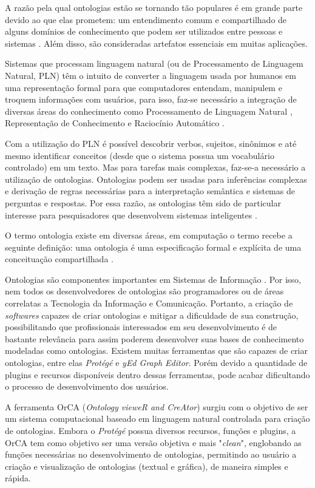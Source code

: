 \documentclass{bcc}
\begin{document}
A razão pela qual ontologias estão se tornando tão populares é em grande parte devido ao que elas prometem: um entendimento comum e compartilhado de alguns domínios de conhecimento que podem ser utilizados entre pessoas e sistemas \cite{fensel2001}. Além disso, são consideradas artefatos essenciais em muitas aplicações.

Sistemas que processam linguagem natural (ou de Processamento de Linguagem Natural, PLN) têm o intuito de converter a linguagem usada por humanos em uma representação formal para que computadores entendam, manipulem e troquem informações com usuários, para isso, faz-se necessário a integração de diversas áreas do conhecimento como Processamento de Linguagem Natural \cite{brill1995}, Representação de Conhecimento \cite{levesque1986} e Raciocínio Automático \cite{wos1984}.

Com a utilização do PLN é possível descobrir verbos, sujeitos, sinônimos e até mesmo identificar conceitos (desde que o sistema possua um vocabulário controlado) em um texto. Mas para tarefas mais complexas, faz-se-a necessário a utilização de ontologias. Ontologias podem ser usadas para inferências complexas e derivação de regras necessárias para a interpretação semântica e sistemas de perguntas e respostas. Por essa razão, as ontologias têm sido de particular interesse para pesquisadores que desenvolvem sistemas inteligentes \cite{liu2011}.

O termo ontologia existe em diversas áreas, em computação o termo recebe a seguinte definição: uma ontologia é uma especificação formal e explícita de uma conceituação compartilhada \cite{gruber1995}.

Ontologias são componentes importantes em Sistemas de Informação \cite{estival2004}. Por isso, nem todos os desenvolvedores de ontologias são programadores ou de áreas correlatas a Tecnologia da Informação e Comunicação. Portanto, a criação de \textit{softwares} capazes de criar ontologias e mitigar a dificuldade de sua construção, possibilitando que profissionais interessados em seu desenvolvimento é de bastante relevância para assim poderem desenvolver suas bases de conhecimento modeladas como ontologias. Existem muitas ferramentas que são capazes de criar ontologias, entre elas \textit{Protégé} \cite{noy2001} e \textit{yEd Graph Editor}. Porém devido a quantidade de plugins e recursos disponíveis dentro dessas ferramentas, pode acabar dificultando o processo de desenvolvimento dos usuários.

A ferramenta OrCA (\textit{Ontology vieweR and CreAtor}) surgiu com o objetivo de ser um sistema computacional baseado em linguagem natural controlada para criação de ontologias. Embora o \textit{Protégé} possua diversos recursos, funções e plugins, a OrCA tem como objetivo ser uma versão objetiva e mais "\textit{clean}", englobando as funções necessárias no desenvolvimento de ontologias, permitindo ao usuário a criação e visualização de ontologias (textual e gráfica), de maneira simples e rápida.
\end{document}
